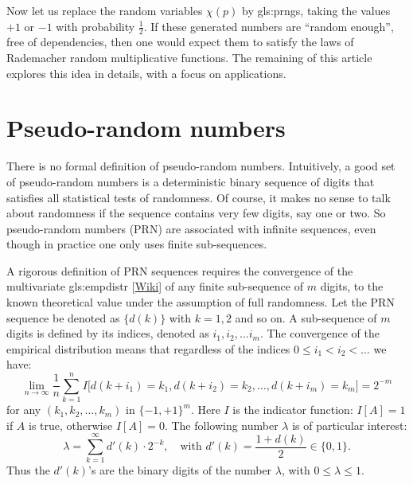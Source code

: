 \documentclass[oneside,10pt]{book}
\begin{document}
Now let us replace the random variables $\chi(p)$ by \glspl{gls:prng}, taking the values $+1$
 or $-1$ with probability $\frac{1}{2}$. If these generated numbers are ``random enough'', free of dependencies, then one would expect them to 
 satisfy the laws of Rademacher random multiplicative functions. The remaining of this article explores this idea in
 details, with a focus on applications.  

\section{Pseudo-random numbers}

There is no formal definition of pseudo-random numbers. Intuitively, a good set of pseudo-random numbers is a  
deterministic binary sequence of digits that satisfies all statistical tests of randomness. Of course, it makes no sense to talk about 
randomness if the sequence contains very few digits, say one or two. So pseudo-random numbers (PRN) are associated with
 infinite sequences, even though in practice one only uses finite sub-sequences.


A rigorous definition of PRN sequences requires the convergence of the 
multivariate \gls{gls:empdistr}
 [\href{https://en.wikipedia.org/wiki/Empirical_distribution_function}{Wiki}]
 of any finite sub-sequence of $m$ digits, to the known theoretical value under the assumption of full randomness.  Let the PRN 
sequence be denoted as $\{d(k)\}$ with $k=1,2$ and so on. A sub-sequence of $m$ digits is defined by its indices, denoted as $i_1,i_2,\dots i_m$.  The convergence of the empirical distribution means that regardless 
of the indices $0\leq i_1 < i_2< \dots$ we have:
\begin{equation}
 \lim_{n\rightarrow\infty} \frac{1}{n}\sum_{k=1}^n I\Big[d(k+i_1)=k_1,d(k+i_2)=k_2,\dots,d(k+i_m)=k_m\Big] = 2^{-m} \label{eqrdv}
\end{equation}
for any $(k_1,k_2,\dots,k_m)$ in $\{-1,+1\}^m$. Here $I$ is the indicator function: $I[A]=1$ if $A$ is true, otherwise $I[A]=0$. The following number $\lambda$ is of particular interest:
\begin{equation}
\lambda=\sum_{k=1}^\infty d'(k) \cdot 2^{-k}, \quad \text{with } d'(k)=\frac{1+d(k)}{2} \in \{0, 1\}. \label{zzxdx}
\end{equation}
Thus the $d'(k)$'s are the binary digits of the number $\lambda$, with $0\leq \lambda\leq 1$. 
\end{document}
